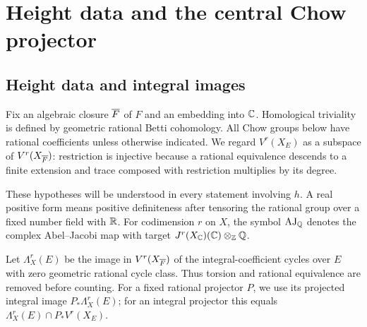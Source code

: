 \section{Height data and the central Chow projector}\label{sec:setup}

\subsection{Height data and integral images}\label{sec:height-data}

Fix an algebraic closure \(\overline F\) of \(F\) and an embedding into
\(\mathbb C\). Homological triviality is defined by geometric rational
Betti cohomology. All Chow groups below have rational coefficients
unless otherwise indicated. We regard \(V^r(X_E)\) as a subspace
of \(V^r(X_{\overline F})\): restriction is injective because a rational
equivalence descends to a finite extension and trace composed with
restriction multiplies by its degree.


These hypotheses will be understood in every statement involving
\(h\). A real positive form means positive definiteness after
tensoring the rational group over a fixed number field with \(\mathbb R\).
For codimension \(r\) on \(X\), the symbol \(\operatorname{AJ}_\mathbb Q\)
denotes the complex Abel--Jacobi map with target
\(J^r(X_\mathbb C)(\mathbb C)\otimes_\mathbb Z\mathbb Q\).

Let \(\Lambda_X^r(E)\) be the image in \(V^r(X_{\overline F})\) of the
integral-coefficient cycles over \(E\) with zero geometric rational
cycle class. Thus torsion and rational equivalence are removed before
counting. For a fixed rational projector \(P\), we use its projected
integral image \(P_*\Lambda_X^r(E)\); for an integral projector this
equals \(\Lambda_X^r(E)\cap P_*V^r(X_E)\).

